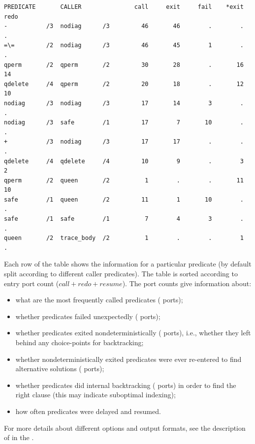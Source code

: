 \vfill %

\begin{verbatim}
PREDICATE       CALLER               call     exit     fail    *exit     redo
-           /3  nodiag      /3         46       46        .        .        .
=\=         /2  nodiag      /3         46       45        1        .        .
qperm       /2  qperm       /2         30       28        .       16       14
qdelete     /4  qperm       /2         20       18        .       12       10
nodiag      /3  nodiag      /3         17       14        3        .        .
nodiag      /3  safe        /1         17        7       10        .        .
+           /3  nodiag      /3         17       17        .        .        .
qdelete     /4  qdelete     /4         10        9        .        3        2
qperm       /2  queen       /2          1        .        .       11       10
safe        /1  queen       /2         11        1       10        .        .
safe        /1  safe        /1          7        4        3        .        .
queen       /2  trace_body  /2          1        .        .        1        .
\end{verbatim}
Each row of the table shows the information for a particular predicate
(by default split according to different caller predicates).
The table is sorted according to entry port count ($call+redo+resume$).
The port counts give information about:
\begin{itemize}
\item what are the most frequently called predicates ( ports);
\item whether predicates failed unexpectedly ( ports);
\item whether predicates exited nondeterministically ( ports),
  i.e.,
    whether they left behind any choice-points for backtracking;
\item whether nondeterministically exited predicates were ever re-entered
    to find alternative solutions ( ports);
\item whether predicates did internal backtracking ( ports) in
  order
    to find the right clause (this may indicate suboptimal indexing);
\item how often predicates were delayed and resumed.
\end{itemize}
For more details about different options and output formats, see
the description of
%
in the .


